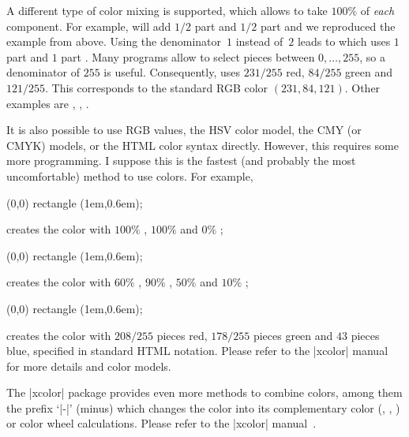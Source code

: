 {A different type of color mixing is supported, which allows to take $100\%$ of
\emph{each} component. For example,  will
add $1/2$ part  and $1/2$ part 
and we reproduced the example from above. Using the denominator~$1$ instead
of~$2$ leads to  which uses $1$ part
 and $1$ part . Many programs
allow to select pieces between $0,\dotsc,255$, so a denominator of $255$ is
useful. Consequently,  uses
$231/255$ red, $84/255$ green and $121/255$. This corresponds to the standard
RGB color $(231,84,121)$. Other examples are
,
,
.

It is also possible to use RGB values, the HSV color model, the CMY (or CMYK)
models, or the HTML color syntax directly. However, this requires some more
programming. I suppose this is the fastest (and probably the most
uncomfortable) method to use colors. For example,
%
\begin{codeexample}[]
\tikz \fill[color1]
    (0,0) rectangle (1em,0.6em);
\end{codeexample}
%
\noindent creates the color with $100\%$ , $100\%$
 and $0\%$ ;
%
\begin{codeexample}[]
\tikz \fill[color1]
    (0,0) rectangle (1em,0.6em);
\end{codeexample}
%
\noindent creates the color with $60\%$ , $90\%$
, $50\%$  and $10\%$
;

\begin{codeexample}[]
\tikz \fill[color1]
    (0,0) rectangle (1em,0.6em);
\end{codeexample}
%
\noindent creates the color with $208/255$ pieces red, $178/255$ pieces green
and $43$ pieces blue, specified in standard HTML notation. Please refer to the
|xcolor| manual~\cite{xcolor} for more details and color models.

The |xcolor| package provides even more methods to combine colors, among them
the prefix `|-|' (minus) which changes the color into its complementary color
(, , )
or color wheel calculations. Please refer to the |xcolor| manual~\cite{xcolor}.
}%


